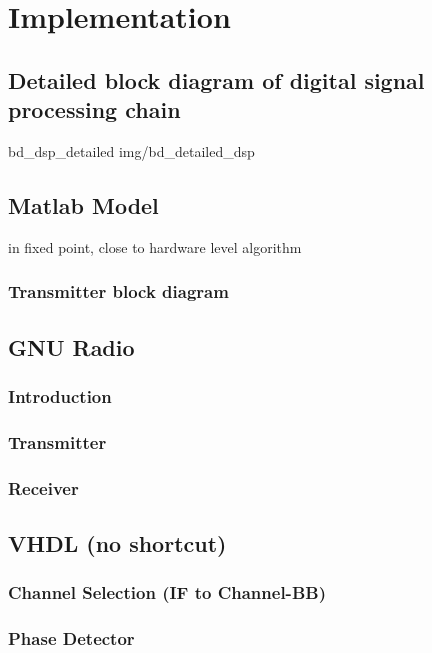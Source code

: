 \chapter{Implementation}
\label{cha:Implementation}

\section{Detailed block diagram of digital signal processing chain}

 {bd_dsp_detailed} {img/bd_detailed_dsp}

\section{Matlab Model}

in fixed point, close to hardware level algorithm

\subsection{Transmitter block diagram}

\section{GNU Radio}
  \subsection{Introduction}
  \subsection{Transmitter}
  \subsection{Receiver}

\section{VHDL (no shortcut)}
  \subsection{Channel Selection (IF to Channel-BB)}
  \subsection{Phase Detector}
